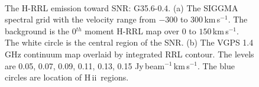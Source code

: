 \documentclass[manuscript]{aastex61}
\newcommand{\hii}{{\rm H\,}{{\sc ii}}}
\newcommand{\kms}{\,km\,s$^{-1}$}
\begin{document}
\begin{figure}[H]
	\centering
	\\
	\caption{The H-RRL emission toward SNR: G35.6-0.4.
	(a) The SIGGMA spectral grid with the velocity range from $-300$ to $300$\kms.
	The background is the 0$^{th}$ moment H-RRL map over $0$ to $150$\kms.
	The white circle is the central region of the SNR.
	(b) The VGPS 1.4 GHz continuum map overlaid by integrated RRL contour.
	The levels are 0.05, 0.07, 0.09, 0.11, 0.13, 0.15 Jy\,beam$^{-1}$\kms.
	The blue circles are location of \hii\ regions.
	}
	\label{fig_snr-g356}
\end{figure}
\end{document}
